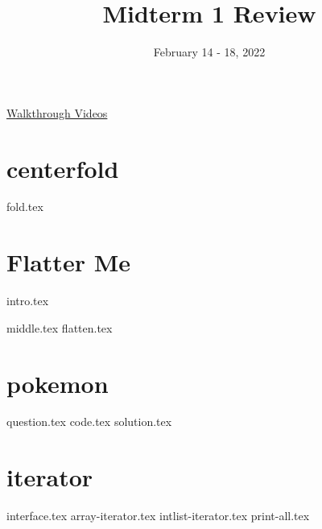 \documentclass[11pt]{exam}
\title{Midterm 1 Review}
\date{February 14 - 18, 2022}
\begin{document}
\maketitle

\href{https://youtube.com/playlist?list=PLN303KpCz_KRtU6eH7zynC3qkxtip-Nzo}{Walkthrough Videos}

\section{centerfold}
\begin{questions}
{fold.tex}
\end{questions}


\section{Flatter Me}
{intro.tex}
\begin{questions}
{middle.tex}
{flatten.tex}
\end{questions}

\pagebreak
\section{pokemon}
\begin{questions}
{question.tex}
{code.tex}
{solution.tex}
\end{questions}

\pagebreak
\section{iterator}
\begin{questions}
{interface.tex}
{array-iterator.tex}
{intlist-iterator.tex}
{print-all.tex}
\end{questions}
\end{document}

